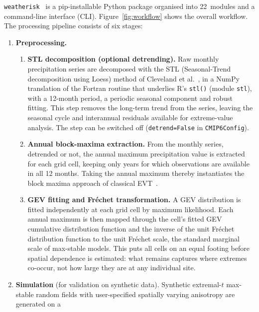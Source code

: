 \documentclass[preprint,12pt,a4paper]{elsarticle}
\newcommand{\rev}[1]{{#1}}
\newcommand{\revr}[1]{{#1}}
\newcommand{\revt}[1]{{#1}}
\begin{document}
\texttt{weatherisk}~\cite{weatherisk} is a pip-installable Python package organised
into 22~modules and a command-line interface (CLI).  Figure~\ref{fig:workflow}
shows the overall workflow. The processing pipeline consists of six
stages:

\begin{enumerate}
\item \textbf{\rev{Preprocessing.}}
  \begin{enumerate}
  \item[\textbf{(a)}] \textbf{\rev{STL decomposition (optional detrending).}}
    Raw monthly precipitation series are decomposed with the STL
    (Seasonal-Trend decomposition using Loess) method of Cleveland
    et al.~\cite{cleveland1990}, in a NumPy translation of the
    Fortran routine that underlies R's \texttt{stl()} (module
    \texttt{stl}), with a 12-month period, a periodic seasonal
    component and robust fitting. \revt{This
    step removes the long-term trend from the series,
    leaving the seasonal cycle and interannual residuals available for
    extreme-value analysis.} The step can be
    switched off (\texttt{detrend=False} in \texttt{CMIP6Config}).
  \item[\textbf{(b)}] \textbf{\rev{Annual block-maxima extraction.}}
    \rev{From the monthly series, detrended or not, the annual maximum
    precipitation value is extracted for each grid cell, \revt{keeping
    only years for which observations are available in all 12 months}.
    \revt{Taking the
    annual maximum thereby instantiates} the \revt{block maxima}
    approach of classical EVT~\cite{dehaan2006}.}
  \item[\textbf{(c)}] \textbf{\rev{GEV fitting and Fr\'{e}chet
    transformation.}}
    \rev{A GEV distribution is fitted independently at each grid cell
    by maximum likelihood. Each annual maximum is then mapped
    through the cell's fitted GEV cumulative distribution function and
    the inverse of the unit Fr\'{e}chet distribution function to the
    unit Fr\'{e}chet scale, the standard marginal scale of
    max-stable models.
    \revr{This puts all cells on an equal footing before spatial
    dependence is estimated: what remains captures where extremes
    co-occur, not how large they are at any individual site.}}
  \end{enumerate}
\item \textbf{Simulation} (for validation on synthetic data).
  Synthetic extremal-$t$ max-stable random fields with
  user-specified spatially varying anisotropy are generated on a

\end{enumerate}
\end{document}
